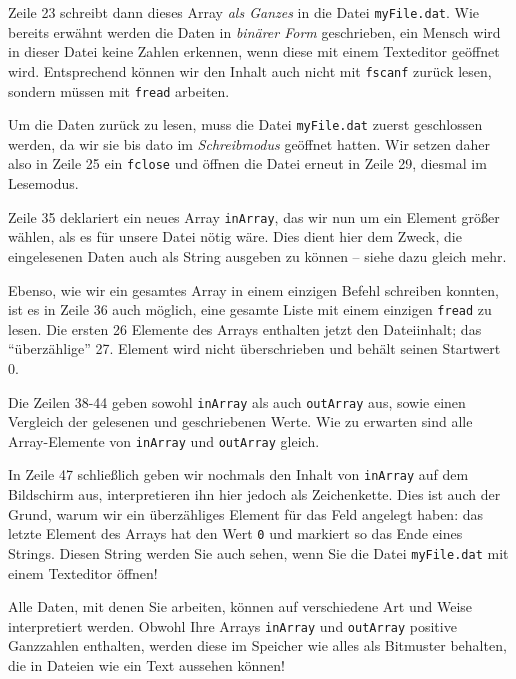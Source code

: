 Zeile 23 schreibt dann dieses Array \emph{als Ganzes} in die Datei \texttt{myFile.dat}. Wie bereits erwähnt werden die Daten in \emph{binärer Form} geschrieben, \ie ein Mensch wird in dieser Datei keine Zahlen erkennen, wenn diese mit einem Texteditor geöffnet wird. Entsprechend können wir den Inhalt auch nicht mit \texttt{fscanf} zurück lesen, sondern müssen mit \texttt{fread} arbeiten.

Um die Daten zurück zu lesen, muss die Datei \texttt{myFile.dat} zuerst geschlossen werden, da wir sie bis dato im \emph{Schreibmodus} geöffnet hatten. Wir setzen daher also in Zeile 25 ein \texttt{fclose} und öffnen die Datei erneut in Zeile 29, diesmal im Lesemodus.

Zeile 35 deklariert ein neues Array \texttt{inArray}, das wir nun um ein Element größer wählen, als es für unsere Datei nötig wäre. Dies dient hier dem Zweck, die eingelesenen Daten auch als String ausgeben zu können -- siehe dazu gleich mehr.

Ebenso, wie wir ein gesamtes Array in einem einzigen Befehl schreiben konnten, ist es in Zeile 36 auch möglich, eine gesamte Liste mit einem einzigen \texttt{fread} zu lesen. Die ersten 26 Elemente des Arrays enthalten jetzt den Dateiinhalt; das \enquote{überzählige} 27. Element wird nicht überschrieben und behält seinen Startwert 0.

Die Zeilen 38-44 geben sowohl \texttt{inArray} als auch \texttt{outArray} aus, sowie einen Vergleich der gelesenen und geschriebenen Werte. Wie zu erwarten sind alle Array-Elemente von \texttt{inArray} und \texttt{outArray} gleich.

In Zeile 47 schließlich geben wir nochmals den Inhalt von \texttt{inArray} auf dem Bildschirm aus, interpretieren ihn hier jedoch als Zeichenkette. Dies ist auch der Grund, warum wir ein überzähliges Element für das Feld angelegt haben: das letzte Element des Arrays hat den Wert \texttt{0} und markiert so das Ende eines Strings. Diesen String werden Sie auch sehen, wenn Sie die Datei \texttt{myFile.dat} mit einem Texteditor öffnen!

Alle Daten, mit denen Sie arbeiten, können auf verschiedene Art und Weise interpretiert werden. Obwohl Ihre Arrays \texttt{inArray} und \texttt{outArray} positive Ganzzahlen enthalten, werden diese im Speicher wie alles als Bitmuster behalten, die in Dateien wie ein Text aussehen können!

